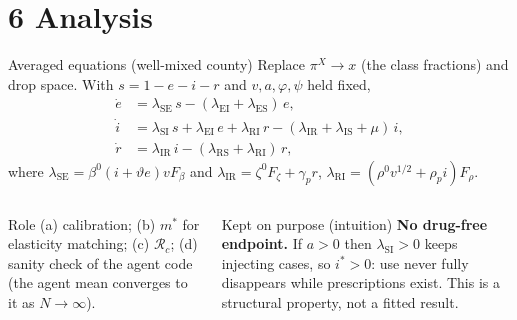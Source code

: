 ﻿\documentclass[9pt,aspectratio=169]{beamer}
\newenvironment{kept}{\begin{exampleblock}{Kept on purpose (intuition)}\small}{\end{exampleblock}}
\newcommand{\Sc}{\mathrm{S}}\newcommand{\Ec}{\mathrm{E}}\newcommand{\Ic}{\mathrm{I}}\newcommand{\Rc}{\mathrm{R}}\newcommand{\Dc}{\mathrm{D}}
\newcommand{\Rzero}{\mathcal R_c}
\begin{document}
\section{6 Analysis}
\begin{frame}{Averaged equations (well-mixed county)}
 Replace $\pi^X\to x$ (the class fractions) and drop space. With $s=1-e-i-r$ and $v,a,\varphi,\psi$ held fixed,
 \begin{align*}
  \dot e&=\lambda_{\Sc\Ec}\,s-(\lambda_{\Ec\Ic}+\lambda_{\Ec\Sc})\,e,\\
  \dot i&=\lambda_{\Sc\Ic}\,s+\lambda_{\Ec\Ic}\,e+\lambda_{\Rc\Ic}\,r-(\lambda_{\Ic\Rc}+\lambda_{\Ic\Sc}+\mu)\,i,\\
  \dot r&=\lambda_{\Ic\Rc}\,i-(\lambda_{\Rc\Sc}+\lambda_{\Rc\Ic})\,r,
 \end{align*}
 where $\lambda_{\Sc\Ec}=\beta^0(i+\vartheta e)vF_\beta$ and $\lambda_{\Ic\Rc}=\zeta^0F_\zeta+\gamma_p r$, $\lambda_{\Rc\Ic}=(\rho^0v^{1/2}+\rho_pi)F_\rho$.
 \begin{columns}[T]
 \begin{block}{Role}\small
  (a) calibration; (b) $m^\ast$ for elasticity matching; (c) $\Rzero$; (d) sanity check of the agent code (the agent mean converges to it as $N\to\infty$).
 \end{block}
 \begin{kept}
  \textbf{No drug-free endpoint.} If $a>0$ then $\lambda_{\Sc\Ic}>0$ keeps injecting cases, so $i^\ast>0$: use never fully disappears while prescriptions exist. This is a structural property, not a fitted result.
 \end{kept}
 \end{columns}
\end{frame}
\end{document}

